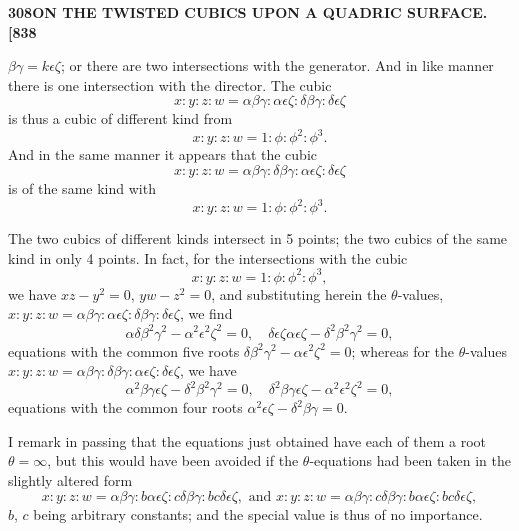 \documentclass[11pt,a4paper]{book}
\begin{document}
\newpage
\setcounter{page}{308}

\noindent\textbf{308}\hfill\textbf{ON THE TWISTED CUBICS UPON A QUADRIC SURFACE.}\hfill\textbf{[838}

\bigskip

\noindent $\beta\gamma = k\epsilon\zeta$; or there are two intersections with the generator. And in like manner there is one intersection with the director. The cubic
\[
x : y : z : w = \alpha\beta\gamma : \alpha\epsilon\zeta : \delta\beta\gamma : \delta\epsilon\zeta
\]
is thus a cubic of different kind from
\[
x : y : z : w = 1 : \phi : \phi^2 : \phi^3.
\]
And in the same manner it appears that the cubic
\[
x : y : z : w = \alpha\beta\gamma : \delta\beta\gamma : \alpha\epsilon\zeta : \delta\epsilon\zeta
\]
is of the same kind with
\[
x : y : z : w = 1 : \phi : \phi^2 : \phi^3.
\]

The two cubics of different kinds intersect in 5 points; the two cubics of the same kind in only 4 points. In fact, for the intersections with the cubic
\[
x : y : z : w = 1 : \phi : \phi^2 : \phi^3,
\]
we have $xz - y^2 = 0$, $yw - z^2 = 0$, and substituting herein the $\theta$-values, $x : y : z : w = \alpha\beta\gamma : \alpha\epsilon\zeta : \delta\beta\gamma : \delta\epsilon\zeta$, we find
\[
\alpha\delta\beta^2\gamma^2 - \alpha^2\epsilon^2\zeta^2 = 0, \quad \delta\epsilon\zeta\alpha\epsilon\zeta - \delta^2\beta^2\gamma^2 = 0,
\]
equations with the common five roots $\delta\beta^2\gamma^2 - \alpha\epsilon^2\zeta^2 = 0$; whereas for the $\theta$-values $x : y : z : w = \alpha\beta\gamma : \delta\beta\gamma : \alpha\epsilon\zeta : \delta\epsilon\zeta$, we have
\[
\alpha^2\beta\gamma\epsilon\zeta - \delta^2\beta^2\gamma^2 = 0, \quad \delta^2\beta\gamma\epsilon\zeta - \alpha^2\epsilon^2\zeta^2 = 0,
\]
equations with the common four roots $\alpha^2\epsilon\zeta - \delta^2\beta\gamma = 0$.

I remark in passing that the equations just obtained have each of them a root $\theta = \infty$, but this would have been avoided if the $\theta$-equations had been taken in the slightly altered form
\[
x : y : z : w = \alpha\beta\gamma : b\alpha\epsilon\zeta : c\delta\beta\gamma : bc\delta\epsilon\zeta, \text{ and } x : y : z : w = \alpha\beta\gamma : c\delta\beta\gamma : b\alpha\epsilon\zeta : bc\delta\epsilon\zeta,
\]
$b$, $c$ being arbitrary constants; and the special value is thus of no importance.
\end{document}
